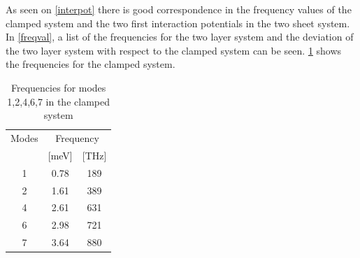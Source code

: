 As seen on \cref{interpot} there is good correspondence in the frequency values of the clamped system and the two first interaction potentials in the two sheet system. In \cref{freqval}, a list of the frequencies for the two layer system and the deviation of the two layer system with respect to the clamped system can be seen. \cref{freqclamp} shows the frequencies for the clamped system.
\begin{table}
  \centering
  \begin{tabular}{c|cc}
    \toprule
     Modes &     \multicolumn{2}{c}{Frequency}\\
           &   [\si{\meV}] & [THz] \\
    \hline \hline
           1 &        0.78 & 189 \\
           2 &        1.61 & 389 \\
           4 &        2.61 & 631 \\
           6 &        2.98 & 721 \\
           7 &        3.64 & 880 \\
    \bottomrule
  \end{tabular}
  \caption{Frequencies for modes 1,2,4,6,7 in the clamped system}
  \label{freqclamp}
\end{table}
